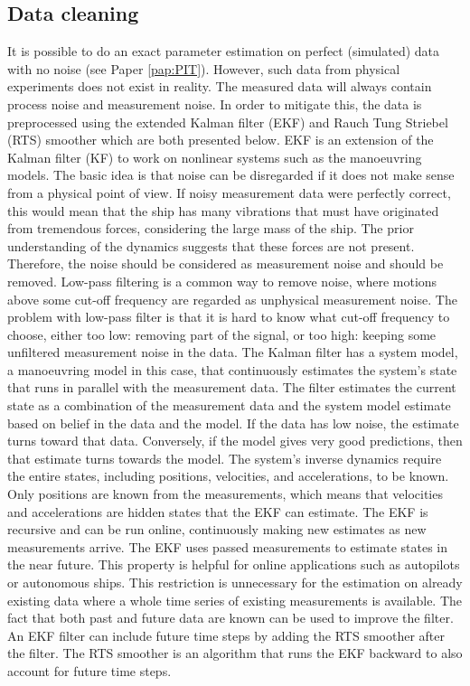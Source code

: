 \subsection{Data cleaning}
\label{sec:datacleaning}
It is possible to do an exact parameter estimation on perfect (simulated) data with no noise (see Paper \ref{pap:PIT}). However, such data from physical experiments does not exist in reality. The measured data will always contain process noise and measurement noise. In order to mitigate this, the data is preprocessed using the extended Kalman filter (EKF) \cite{brown_introduction_1997} and Rauch Tung Striebel (RTS) smoother \cite{rauch_maximum_1965} which are both presented below.
EKF is an extension of the Kalman filter (KF) to work on nonlinear systems such as the manoeuvring models. The basic idea is that noise can be disregarded if it does not make sense from a physical point of view. If noisy measurement data were perfectly correct, this would mean that the ship has many vibrations that must have originated from tremendous forces, considering the large mass of the ship. The prior understanding of the dynamics suggests that these forces are not present. Therefore, the noise should be considered as measurement noise and should be removed. Low-pass filtering is a common way to remove noise, where motions above some cut-off frequency are regarded as unphysical measurement noise. The problem with low-pass filter is that it is hard to know what cut-off frequency to choose, either too low: removing part of the signal, or too high: keeping some unfiltered measurement noise in the data. The Kalman filter has a system model, a manoeuvring model in this case, that continuously estimates the system’s state that runs in parallel with the measurement data. The filter estimates the current state as a combination of the measurement data and the system model estimate based on belief in the data and the model. If the data has low noise, the estimate turns toward that data. Conversely, if the model gives very good predictions, then that estimate turns towards the model.
The system’s inverse dynamics require the entire states, including positions, velocities, and accelerations, to be known. Only positions are known from the measurements, which means that velocities and accelerations are hidden states that the EKF can estimate.
The EKF is recursive and can be run online, continuously making new estimates as new measurements arrive. The EKF uses passed measurements to estimate states in the near future. This property is helpful for online applications such as  autopilots or autonomous ships. This restriction is  unnecessary for the estimation on already existing data where a whole time series of existing measurements is available. The fact that both past and future data are known can be used to improve the filter. An EKF filter can include future time steps by adding the RTS smoother after the filter. The RTS smoother is an algorithm that runs the EKF backward to also account for future time steps.

